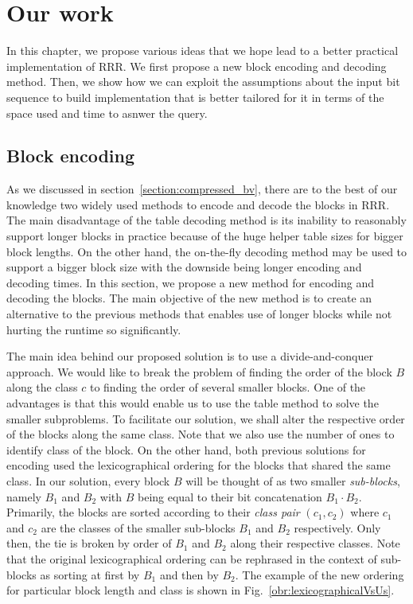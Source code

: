 \chapter{Our work}
\label{kap:kap3}

In this chapter, we propose various ideas that we hope lead to a better practical
implementation of RRR. We first propose a new block encoding and decoding method.
Then, we show how we can exploit the assumptions about the input bit sequence to build
implementation that is better tailored for it in terms of the space used and time to
asnwer the query.

\section{Block encoding}

As we discussed in section~\ref{section:compressed_bv}, there are to
the best of our knowledge two widely used methods to encode and decode the
blocks in RRR. The main disadvantage of the table decoding method is its
inability to reasonably support longer blocks in practice because of the
huge helper table sizes for bigger block lengths. On the other hand, the on-the-fly
decoding method may be used to support a bigger block size with the downside
being longer encoding and decoding times. In this section, we propose a new
method for encoding and decoding the blocks. The main objective of the new
method is to create an alternative to the previous methods that enables use
of longer blocks while not hurting the runtime so significantly.

The main idea behind our proposed solution is to use a divide-and-conquer approach.
We would like to break the problem of finding the order of the block $B$ along
the class $c$ to finding the order of several smaller blocks. One of the advantages
is that this would enable us to use the table method to solve the smaller subproblems.
To facilitate our solution, we shall alter the respective order of the blocks along
the same class. Note that we also use the number of ones to identify class
of the block. On the other hand, both previous solutions for encoding used the lexicographical
ordering for the blocks that shared the same class. In our solution, every block $B$ will
be thought of as two smaller \textit{sub-blocks}, namely $B_1$ and $B_2$ with $B$ being equal
to their bit concatenation $B_1\cdot B_2$. Primarily, the blocks are sorted according to their
\textit{class pair} $(c_1, c_2)$ where $c_1$ and $c_2$ are the classes of the smaller sub-blocks
$B_1$ and $B_2$ respectively. Only then, the tie is broken by order of $B_1$ and $B_2$ along
their respective classes. Note that the original lexicographical ordering can be rephrased in the
context of sub-blocks as sorting at first by $B_1$ and then by $B_2$. The example of the new
ordering for particular block length and class is shown in Fig.~\ref{obr:lexicographicalVsUs}.

